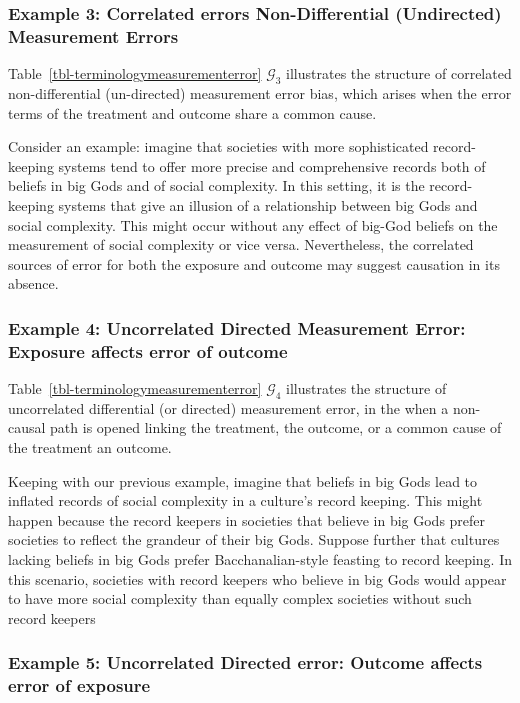 \documentclass[
  single column]{article}
\begin{document}
\subsubsection{Example 3: Correlated errors Non-Differential
(Undirected) Measurement
Errors}\label{example-3-correlated-errors-non-differential-undirected-measurement-errors}

Table~\ref{tbl-terminologymeasurementerror} \(\mathcal{G}_3\)
illustrates the structure of correlated non-differential (un-directed)
measurement error bias, which arises when the error terms of the
treatment and outcome share a common cause.

Consider an example: imagine that societies with more sophisticated
record-keeping systems tend to offer more precise and comprehensive
records both of beliefs in big Gods and of social complexity. In this
setting, it is the record-keeping systems that give an illusion of a
relationship between big Gods and social complexity. This might occur
without any effect of big-God beliefs on the measurement of social
complexity or vice versa. Nevertheless, the correlated sources of error
for both the exposure and outcome may suggest causation in its absence.

\subsubsection{Example 4: Uncorrelated Directed Measurement Error:
Exposure affects error of
outcome}\label{example-4-uncorrelated-directed-measurement-error-exposure-affects-error-of-outcome}

Table~\ref{tbl-terminologymeasurementerror} \(\mathcal{G}_4\)
illustrates the structure of uncorrelated differential (or directed)
measurement error, in the when a non-causal path is opened linking the
treatment, the outcome, or a common cause of the treatment an outcome.

Keeping with our previous example, imagine that beliefs in big Gods lead
to inflated records of social complexity in a culture's record keeping.
This might happen because the record keepers in societies that believe
in big Gods prefer societies to reflect the grandeur of their big Gods.
Suppose further that cultures lacking beliefs in big Gods prefer
Bacchanalian-style feasting to record keeping. In this scenario,
societies with record keepers who believe in big Gods would appear to
have more social complexity than equally complex societies without such
record keepers

\subsubsection{Example 5: Uncorrelated Directed error: Outcome affects
error of
exposure}\label{example-5-uncorrelated-directed-error-outcome-affects-error-of-exposure}
\end{document}
